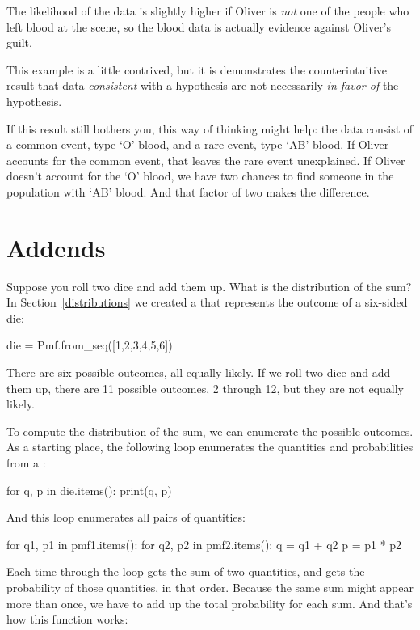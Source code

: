 \documentclass[12pt]{book}
\theoremstyle{exercise}
\begin{document}
The likelihood of the data is slightly higher if Oliver is
{\it not} one of the people who left blood at the scene, so
the blood data is actually evidence against Oliver's guilt.


This example is a little contrived, but it is demonstrates
the counterintuitive result that data {\it consistent} with
a hypothesis are not necessarily {\it in favor of}
the hypothesis.

If this result still bothers you, this way of thinking might help: the data consist of a common event, type `O' blood, and a rare event, type `AB' blood.
If Oliver accounts for the common event, that leaves the rare
event unexplained.  If Oliver doesn't account for the
`O' blood, we have two chances to find someone in the
population with `AB' blood.  And that factor of two makes
the difference.


\section{Addends}
\label{addends}

Suppose you roll two dice and add them up.  What is the distribution of the sum?
In Section~\ref{distributions} we created a  that represents the outcome of a six-sided die:

\begin{code}
die = Pmf.from_seq([1,2,3,4,5,6])
\end{code}

There are six possible outcomes, all equally likely.
If we roll two dice and add them up, there are 11 possible outcomes, 2 through 12, but they are not equally likely.

To compute the distribution of the sum, we can enumerate the possible outcomes.
As a starting place, the following loop enumerates the quantities and probabilities from a :

\begin{code}
for q, p in die.items():
    print(q, p)
\end{code}

And this loop enumerates all pairs of quantities:

\begin{code}
for q1, p1 in pmf1.items():
    for q2, p2 in pmf2.items():
        q = q1 + q2
        p = p1 * p2
\end{code}

Each time through the loop  gets the sum of two quantities, and  gets the probability of those quantities, in that order.
Because the same sum might appear more than once, we have to add up the total probability for each sum.
And that's how this function works:
\end{document}
